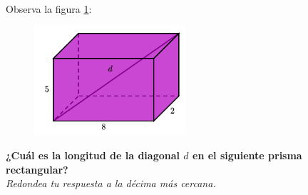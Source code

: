 \question[15]  Observa la figura \ref{fig:pitagoras3D_diag_04}:
\begin{figure}[H]
    \begin{center}
        \includegraphics[width=0.5\textwidth]{../images/pitagoras3D_diag_04.png}
    \end{center}
    \caption{}
    \label{fig:pitagoras3D_diag_04}
\end{figure}
\textbf{¿Cuál es la longitud de la diagonal $d$ en el siguiente prisma rectangular?}\\
\textit{Redondea tu respuesta a la décima más cercana.}
